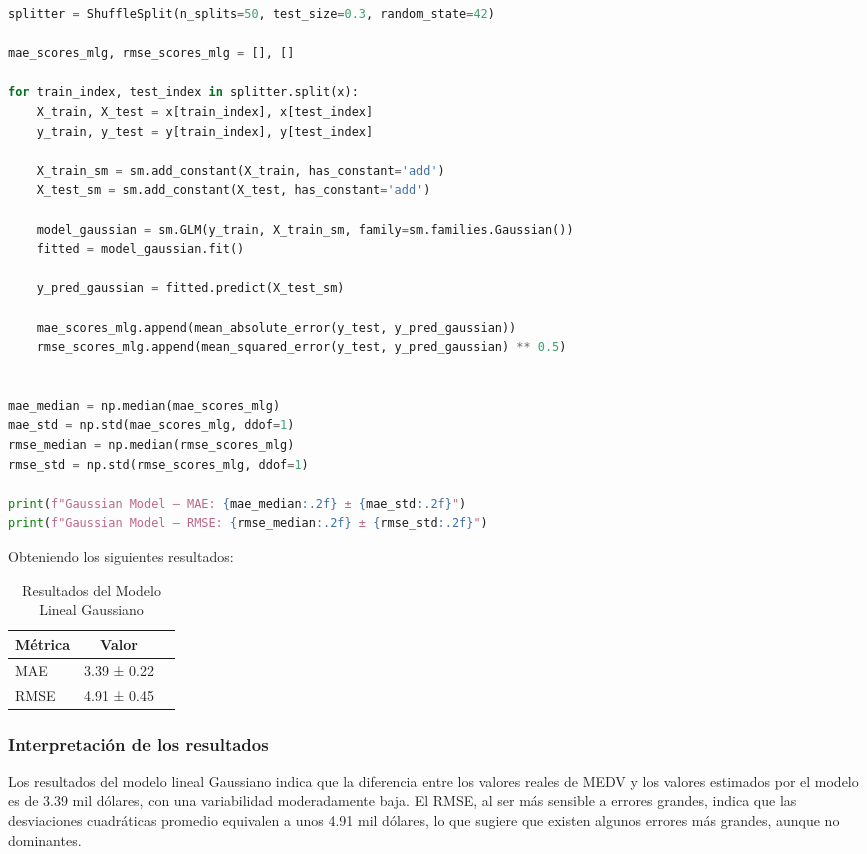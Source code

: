 \documentclass[12pt,a4paper]{article}
\begin{document}
\begin{lstlisting}[language=Python, frame=single, basicstyle=\ttfamily\small, breaklines=true]
splitter = ShuffleSplit(n_splits=50, test_size=0.3, random_state=42)

mae_scores_mlg, rmse_scores_mlg = [], []

for train_index, test_index in splitter.split(x):
    X_train, X_test = x[train_index], x[test_index]
    y_train, y_test = y[train_index], y[test_index]

    X_train_sm = sm.add_constant(X_train, has_constant='add')
    X_test_sm = sm.add_constant(X_test, has_constant='add')

    model_gaussian = sm.GLM(y_train, X_train_sm, family=sm.families.Gaussian())
    fitted = model_gaussian.fit()

    y_pred_gaussian = fitted.predict(X_test_sm)

    mae_scores_mlg.append(mean_absolute_error(y_test, y_pred_gaussian))
    rmse_scores_mlg.append(mean_squared_error(y_test, y_pred_gaussian) ** 0.5)


mae_median = np.median(mae_scores_mlg)
mae_std = np.std(mae_scores_mlg, ddof=1)
rmse_median = np.median(rmse_scores_mlg)
rmse_std = np.std(rmse_scores_mlg, ddof=1)

print(f"Gaussian Model – MAE: {mae_median:.2f} ± {mae_std:.2f}")
print(f"Gaussian Model – RMSE: {rmse_median:.2f} ± {rmse_std:.2f}")
\end{lstlisting}

Obteniendo los siguientes resultados:

\vspace{0.3cm}

\begin{table}[H]
\centering
\caption{Resultados del Modelo Lineal Gaussiano}\label{tab:regresion_resultados}
\begin{tabular}{lcc}
\toprule
\textbf{Métrica} & \textbf{Valor} \\
\midrule
MAE & 3.39 ± 0.22  \\
RMSE & 4.91 ± 0.45  \\
\bottomrule
\end{tabular}
\end{table}

\subsubsection{Interpretación de los resultados}

Los resultados del modelo lineal Gaussiano indica que la diferencia entre los valores reales de MEDV y los valores estimados por el modelo es de 3.39 mil dólares, con una variabilidad moderadamente baja.
El RMSE, al ser más sensible a errores grandes, indica que las desviaciones cuadráticas promedio equivalen a unos 4.91 mil dólares, lo que sugiere que existen algunos errores más grandes, aunque no dominantes.
\end{document}
